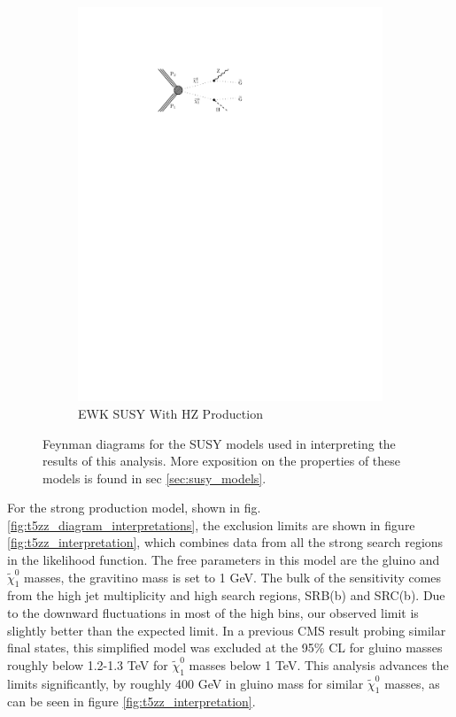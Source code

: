 \begin{figure}[!h]
\begin{subfigure}[b]{0.49\textwidth}
        \includegraphics[width=\textwidth]{figures/diagrams/TChiHZ.pdf}
        \caption{EWK SUSY With HZ Production}
        \label{fig:tchihz_diagram_interpretations}
      \end{subfigure}
      \caption{ \label{fig:SUSY_diagrams_interpretation_sec}
        Feynman diagrams for the SUSY models used in interpreting the results of this analysis. More exposition on the properties of these models is found in sec \ref{sec:susy_models}.}
    \end{figure}

    For the strong production model, shown in fig. \ref{fig:t5zz_diagram_interpretations}, the exclusion limits are shown in figure \ref{fig:t5zz_interpretation}, which combines data from all the strong search regions in the likelihood function. The free parameters in this model are the gluino and $\widetilde{\chi}^0_1$ masses, the gravitino mass is set to 1 GeV. The bulk of the sensitivity comes from the high jet multiplicity and high \MET search regions, SRB(b) and SRC(b). Due to the downward fluctuations in most of the high \MET bins, our observed limit is slightly better than the expected limit. In a previous CMS result probing similar final states,\cite{paper_2016} this simplified model was excluded at the 95\% CL for gluino masses roughly below 1.2-1.3 TeV for $\widetilde{\chi}^0_1$ masses below 1 TeV. This analysis advances the limits significantly, by roughly 400 GeV in gluino mass for similar $\widetilde{\chi}^0_1$ masses, as can be seen in figure \ref{fig:t5zz_interpretation}. 

